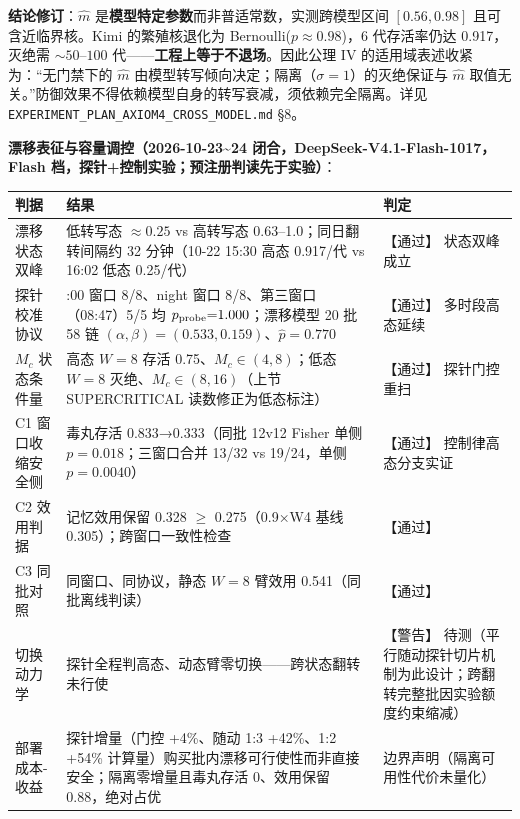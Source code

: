 \textbf{结论修订}：\(\hat m\)
是\textbf{模型特定参数}而非普适常数，实测跨模型区间 \([0.56,0.98]\)
且可含近临界核。Kimi 的繁殖核退化为 Bernoulli(\(p\approx0.98\))，6
代存活率仍达 0.917，灭绝需 \(\sim50\)--\(100\)
代------\textbf{工程上等于不退场}。因此公理 IV
的适用域表述收紧为：``无门禁下的 \(\hat m\)
由模型转写倾向决定；隔离（\(\sigma=1\)）的灭绝保证与 \(\hat m\)
取值无关。''防御效果不得依赖模型自身的转写衰减，须依赖完全隔离。详见
\texttt{EXPERIMENT\_PLAN\_AXIOM4\_CROSS\_MODEL.md} §8。

\textbf{漂移表征与容量调控（2026-10-23\textasciitilde24
闭合，DeepSeek-V4.1-Flash-1017，Flash
档，探针+控制实验；预注册判读先于实验）}：

{\def\LTcaptype{} %
\begin{longtable}[]{@{}
  >{\raggedright\arraybackslash}p{}
  >{\raggedright\arraybackslash}p{}
  >{\raggedright\arraybackslash}p{}@{}}
\toprule\noalign{}
\begin{minipage}[b]{\linewidth}\raggedright
判据
\end{minipage} & \begin{minipage}[b]{\linewidth}\raggedright
结果
\end{minipage} & \begin{minipage}[b]{\linewidth}\raggedright
判定
\end{minipage} \\
\midrule\noalign{}
\endhead
\bottomrule\noalign{}
\endlastfoot
漂移状态双峰 & 低转写态 \(\approx0.25\) vs 高转写态
0.63--1.0；同日翻转间隔约 32 分钟（10-22 15:30 高态 0.917/代 vs 16:02
低态 0.25/代） & 【通过】 状态双峰成立 \\
探针校准协议 & 15:00 窗口 8/8、night 窗口 8/8、第三窗口（08:47）5/5 均
\(p_{\rm probe}{=}1.000\)；漂移模型 20 批 58 链
\((\alpha,\beta){=}(0.533,0.159)\)、\(\hat p{=}0.770\) & 【通过】
多时段高态延续 \\
\(M_c\) 状态条件量 & 高态 \(W{=}8\) 存活 0.75、\(M_c\in(4,8)\)；低态
\(W{=}8\) 灭绝、\(M_c\in(8,16)\)（上节 SUPERCRITICAL
读数修正为低态标注） & 【通过】 探针门控重扫 \\
C1 窗口收缩安全侧 & 毒丸存活 0.833→0.333（同批 12v12 Fisher 单侧
\(p{=}0.018\)；三窗口合并 13/32 vs 19/24，单侧 \(p{=}0.0040\)） &
【通过】 控制律高态分支实证 \\
C2 效用判据 & 记忆效用保留 0.328 \(\ge\) 0.275（0.9×W4 基线
0.305）；跨窗口一致性检查 & 【通过】 \\
C3 同批对照 & 同窗口、同协议，静态 \(W{=}8\) 臂效用
0.541（同批离线判读） & 【通过】 \\
切换动力学 & 探针全程判高态、动态臂零切换------跨状态翻转未行使 &
【警告】
待测（平行随动探针切片机制为此设计；跨翻转完整批因实验额度约束缩减） \\
部署成本-收益 & 探针增量（门控 +4\%、随动 1:3 +42\%、1:2 +54\%
计算量）购买批内漂移可行使性而非直接安全；隔离零增量且毒丸存活
0、效用保留 0.88，绝对占优 & 边界声明（隔离可用性代价未量化） \\
\end{longtable}
}

